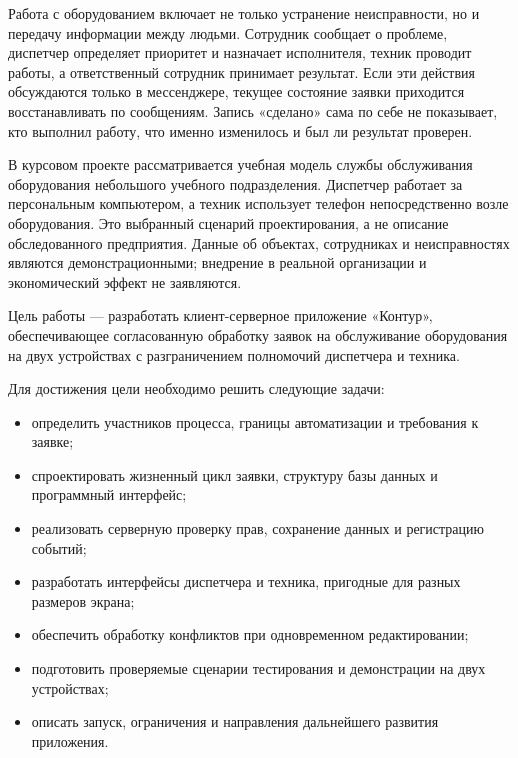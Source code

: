 \documentclass{timcw}
\begin{document}
\cwtitle
{\singlespacing\setlength{\cftbeforetoctitleskip}{0pt}\tableofcontents\par}
\clearpage

\intro

Работа с оборудованием включает не только устранение неисправности, но и передачу информации между людьми. Сотрудник сообщает о проблеме, диспетчер определяет приоритет и назначает исполнителя, техник проводит работы, а ответственный сотрудник принимает результат. Если эти действия обсуждаются только в мессенджере, текущее состояние заявки приходится восстанавливать по сообщениям. Запись «сделано» сама по себе не показывает, кто выполнил работу, что именно изменилось и был ли результат проверен.

В курсовом проекте рассматривается учебная модель службы обслуживания оборудования небольшого учебного подразделения. Диспетчер работает за персональным компьютером, а техник использует телефон непосредственно возле оборудования. Это выбранный сценарий проектирования, а не описание обследованного предприятия. Данные об объектах, сотрудниках и неисправностях являются демонстрационными; внедрение в реальной организации и экономический эффект не заявляются.

Цель работы — разработать клиент-серверное приложение «Контур», обеспечивающее согласованную обработку заявок на обслуживание оборудования на двух устройствах с разграничением полномочий диспетчера и техника.

Для достижения цели необходимо решить следующие задачи:

\begin{itemize}
\item определить участников процесса, границы автоматизации и требования к заявке;
\item спроектировать жизненный цикл заявки, структуру базы данных и программный интерфейс;
\item реализовать серверную проверку прав, сохранение данных и регистрацию событий;
\item разработать интерфейсы диспетчера и техника, пригодные для разных размеров экрана;
\item обеспечить обработку конфликтов при одновременном редактировании;
\item подготовить проверяемые сценарии тестирования и демонстрации на двух устройствах;
\item описать запуск, ограничения и направления дальнейшего развития приложения.
\end{itemize}
\end{document}
